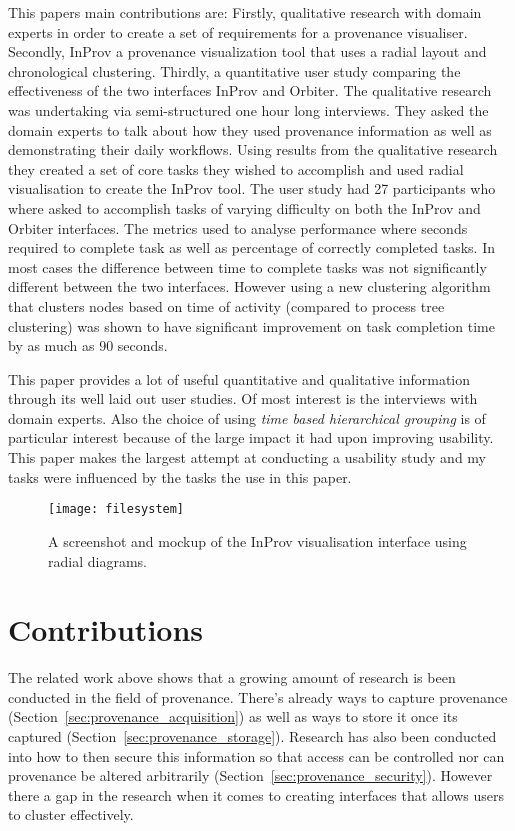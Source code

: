 This papers main contributions are: Firstly, qualitative research with domain experts in order to create a set of requirements for a provenance visualiser. Secondly, InProv a provenance visualization tool that uses a radial layout and chronological clustering. Thirdly, a quantitative user study comparing the effectiveness of the two interfaces InProv and Orbiter. The qualitative research was undertaking via semi-structured one hour long interviews. They asked the domain experts to talk about how they used provenance information as well as demonstrating their daily workflows. Using results from the qualitative research they created a set of core tasks they wished to accomplish and used radial visualisation to create the InProv tool. The user study had 27 participants who where asked to accomplish tasks of varying difficulty on both the InProv and Orbiter interfaces. The metrics used to analyse performance where seconds required to complete task as well as percentage of correctly completed tasks. In most cases the difference between time to complete tasks was not significantly different between the two interfaces. However using a new clustering algorithm that clusters nodes based on time of activity (compared to process tree clustering) was shown to have significant improvement on task completion time by as much as 90 seconds.

This paper provides a lot of useful quantitative and qualitative information through its well laid out user studies. Of most interest is the interviews with domain experts. Also the choice of using \textit{time based hierarchical grouping} is of particular interest because of the large impact it had upon improving usability. This paper makes the largest attempt at conducting a usability study and my tasks were influenced by the tasks the use in this paper.

\begin{figure}[h]
	\centering
	\texttt{[image: filesystem]}
	\caption{A screenshot and mockup of the InProv visualisation interface using radial diagrams.}
	\label{fig:filesystem}
\end{figure}

\section{Contributions}

The related work above shows that a growing amount of research is been conducted in the field of provenance. There's already ways to capture provenance (Section~\ref{sec:provenance_acquisition}) as well as ways to store it once its captured (Section~\ref{sec:provenance_storage}). Research has also been conducted into how to then secure this information so that access can be controlled nor can provenance be altered arbitrarily (Section~\ref{sec:provenance_security}). However there a gap in the research when it comes to creating interfaces that allows users to cluster effectively.

